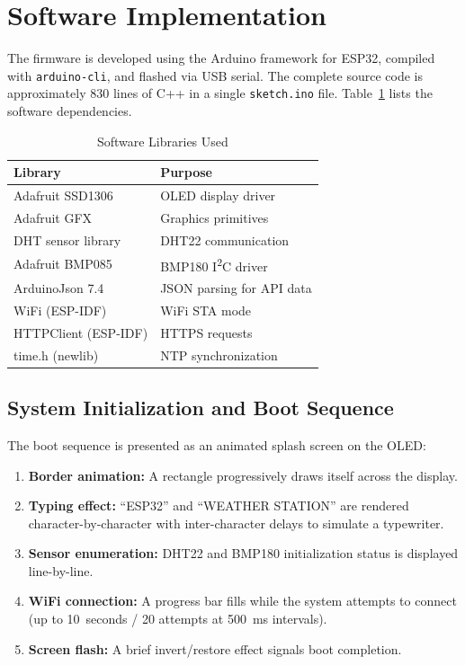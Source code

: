 \documentclass[conference]{IEEEtran}
\begin{document}
\section{Software Implementation}

The firmware is developed using the Arduino framework for ESP32, compiled with \texttt{arduino-cli}, and flashed via USB serial. The complete source code is approximately 830 lines of C++ in a single \texttt{sketch.ino} file. Table~\ref{tab:libraries} lists the software dependencies.

\begin{table}[h]
\centering
\caption{Software Libraries Used}
\label{tab:libraries}
\begin{tabular}{ll}
\toprule
\textbf{Library} & \textbf{Purpose} \\
\midrule
Adafruit SSD1306 & OLED display driver \\
Adafruit GFX & Graphics primitives \\
DHT sensor library & DHT22 communication \\
Adafruit BMP085 & BMP180 I\textsuperscript{2}C driver \\
ArduinoJson 7.4 & JSON parsing for API data \\
WiFi (ESP-IDF) & WiFi STA mode \\
HTTPClient (ESP-IDF) & HTTPS requests \\
time.h (newlib) & NTP synchronization \\
\bottomrule
\end{tabular}
\end{table}

\subsection{System Initialization and Boot Sequence}

The boot sequence is presented as an animated splash screen on the OLED:

\begin{enumerate}
    \item \textbf{Border animation:} A rectangle progressively draws itself across the display.
    \item \textbf{Typing effect:} ``ESP32'' and ``WEATHER STATION'' are rendered character-by-character with inter-character delays to simulate a typewriter.
    \item \textbf{Sensor enumeration:} DHT22 and BMP180 initialization status is displayed line-by-line.
    \item \textbf{WiFi connection:} A progress bar fills while the system attempts to connect (up to 10~seconds / 20 attempts at 500~ms intervals).
    \item \textbf{Screen flash:} A brief invert/restore effect signals boot completion.
\end{enumerate}
\end{document}
